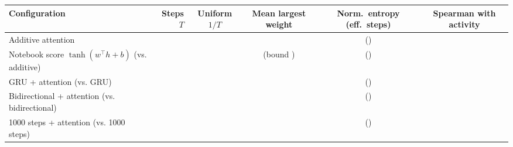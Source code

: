 \begin{tabular}{lrcccc}
\toprule
Configuration & Steps $T$ & Uniform $1/T$ & Mean largest weight & Norm.\ entropy (eff.\ steps) & Spearman with activity \\
\midrule
Additive attention & \rnnAttnStepsAttn{} & \rnnAttnUniformAttn{} & \rnnAttnMaxWeightAttn{} & \rnnAttnEntropyNormAttn{} (\rnnAttnEffectiveStepsAttn{}) & \rnnAttnSpearmanActivityAttn{} \\
Notebook score $\tanh(w^\top h+b)$ (vs. additive) & \rnnAttnStepsAttnTanh{} & \rnnAttnUniformAttnTanh{} & \rnnAttnMaxWeightAttnTanh{} (bound \rnnAttnMaxBoundAttnTanh{}) & \rnnAttnEntropyNormAttnTanh{} (\rnnAttnEffectiveStepsAttnTanh{}) & \rnnAttnSpearmanActivityAttnTanh{} \\
GRU + attention (vs. GRU) & \rnnAttnStepsGruAttn{} & \rnnAttnUniformGruAttn{} & \rnnAttnMaxWeightGruAttn{} & \rnnAttnEntropyNormGruAttn{} (\rnnAttnEffectiveStepsGruAttn{}) & \rnnAttnSpearmanActivityGruAttn{} \\
Bidirectional + attention (vs. bidirectional) & \rnnAttnStepsBiAttn{} & \rnnAttnUniformBiAttn{} & \rnnAttnMaxWeightBiAttn{} & \rnnAttnEntropyNormBiAttn{} (\rnnAttnEffectiveStepsBiAttn{}) & \rnnAttnSpearmanActivityBiAttn{} \\
1000 steps + attention (vs. 1000 steps) & \rnnAttnStepsRawAttn{} & \rnnAttnUniformRawAttn{} & \rnnAttnMaxWeightRawAttn{} & \rnnAttnEntropyNormRawAttn{} (\rnnAttnEffectiveStepsRawAttn{}) & \rnnAttnSpearmanActivityRawAttn{} \\
\bottomrule
\end{tabular}
